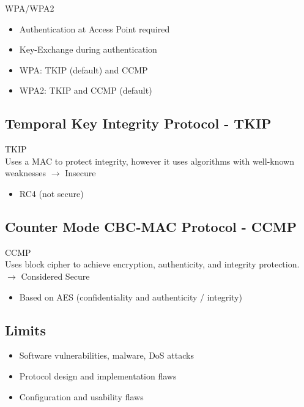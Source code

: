 \begin{concept}{WPA/WPA2}\\
    \begin{itemize}
        \item Authentication at Access Point required
        \item Key-Exchange during authentication
        \item WPA: TKIP (default) and CCMP
        \item WPA2: TKIP and CCMP (default)
    \end{itemize}
\end{concept}

\subsection{Temporal Key Integrity Protocol - TKIP}

\begin{definition}{TKIP}\\
    Uses a MAC to protect integrity, however it uses algorithms with well-known weaknesses $\rightarrow$ Insecure
    \begin{itemize}
        \item RC4 (not secure)
    \end{itemize}
\end{definition}

\subsection{Counter Mode CBC-MAC Protocol - CCMP}

\begin{definition}{CCMP}\\
    Uses block cipher to achieve encryption, authenticity, and integrity protection. $\rightarrow$ Considered Secure
    \begin{itemize}
        \item Based on AES (confidentiality and authenticity / integrity)
    \end{itemize}
\end{definition}


\subsection{Limits}

\begin{remark}
    \begin{itemize}
        \item Software vulnerabilities, malware, DoS attacks
        \item Protocol design and implementation flaws
        \item Configuration and usability flaws
    \end{itemize}
\end{remark}